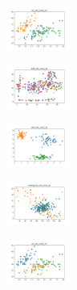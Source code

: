 \vspace*{\fill}
\newpage
\vspace*{\fill}

\begin{figure}[H]    
    \centering
    \begin{subfigure}
        \centering
        \includegraphics[width=0.234\textwidth]{img/ageun/iris_set_const_20_949004259_clust.png}
    \end{subfigure}
    \hfill
    \begin{subfigure}
        \centering
        \includegraphics[width=0.234\textwidth]{img/ageun/ecoli_set_const_20_949004259_clust.png}
    \end{subfigure}
    \hfill
    \begin{subfigure}
        \centering
        \includegraphics[width=0.234\textwidth]{img/ageun/rand_set_const_20_949004259_clust.png}
    \end{subfigure}
    \hfill
    \begin{subfigure}
        \centering
        \includegraphics[width=0.234\textwidth]{img/ageun/newthyroid_set_const_20_949004259_clust.png}
    \end{subfigure}
    \hfill
    \begin{subfigure}
        \centering
        \includegraphics[width=0.234\textwidth]{img/ageun/iris_set_const_20_589741062_clust.png}

\end{subfigure}
\end{figure}
